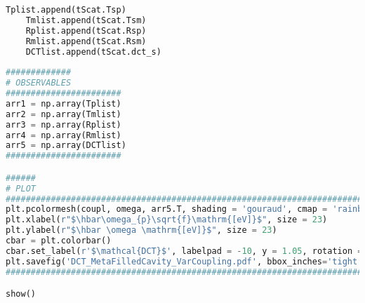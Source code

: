 \documentclass[aps,prl,10pt,onecolumn,superscriptaddress]{revtex4-2}
\begin{document}
\begin{lstlisting}[language=Python, caption=Script for Figure 15]
    Tplist.append(tScat.Tsp)
    Tmlist.append(tScat.Tsm)
    Rplist.append(tScat.Rsp)
    Rmlist.append(tScat.Rsm)
    DCTlist.append(tScat.dct_s)
    
#############
# OBSERVABLES
#######################    
arr1 = np.array(Tplist)
arr2 = np.array(Tmlist)
arr3 = np.array(Rplist)
arr4 = np.array(Rmlist)
arr5 = np.array(DCTlist)
#######################

######
# PLOT
#####################################################################################
plt.pcolormesh(coupl, omega, arr5.T, shading = 'gouraud', cmap = 'rainbow') 
plt.xlabel(r"$\hbar\omega_{p}\sqrt{f}\mathrm{[eV]}$", size = 23)
plt.ylabel(r"$\hbar \omega \mathrm{[eV]}$", size = 23)
cbar = plt.colorbar()
cbar.set_label(r'$\mathcal{DCT}$', labelpad = -10, y = 1.05, rotation = 0, size = 14)
plt.savefig('DCT_MetaFilledCavity_VarCoupling.pdf', bbox_inches='tight')
#####################################################################################

show()
\end{lstlisting}
\newpage
\end{document}
